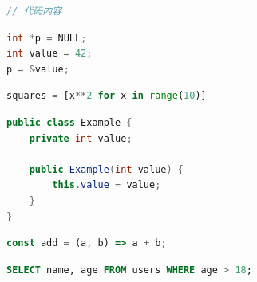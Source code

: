 
\begin{lstlisting}[language=C, caption={说明文字}, label={lst:xxx}]
// 代码内容
\end{lstlisting}


\begin{lstlisting}[language=C, caption={指针初始化示例}, label={lst:ptr_init}]
int *p = NULL;
int value = 42;
p = &value;
\end{lstlisting}

\begin{lstlisting}[language=Python, caption={列表推导式示例}, label={lst:list_comp}]
squares = [x**2 for x in range(10)]
\end{lstlisting}

\begin{lstlisting}[language=Java, caption={类定义示例}, label={lst:java_class}]
public class Example {
    private int value;
    
    public Example(int value) {
        this.value = value;
    }
}
\end{lstlisting}

\begin{lstlisting}[language=JavaScript, caption={箭头函数示例}, label={lst:js_arrow}]
const add = (a, b) => a + b;
\end{lstlisting}

\begin{lstlisting}[language=SQL, caption={查询语句示例}, label={lst:sql_query}]
SELECT name, age FROM users WHERE age > 18;
\end{lstlisting}